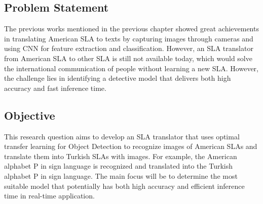 \subsection{Problem Statement}
The previous works mentioned in the previous chapter showed great achievements in translating American SLA to texts by capturing images through cameras and using CNN for feature extraction and classification. However, an SLA translator from American SLA to other SLA is still not available today, which would solve the international communication of people without learning a new SLA. However, the challenge lies in identifying a detective model that delivers both high accuracy and fast inference time.

\subsection{Objective}
This research question aims to develop an SLA translator that uses optimal transfer learning for Object Detection to recognize images of American SLAs and translate them into Turkish SLAs with images. For example, the American alphabet P in sign language is recognized and translated into the Turkish alphabet P in sign language. The main focus will be to determine the most suitable model that potentially has both high accuracy and efficient inference time in real-time application.
